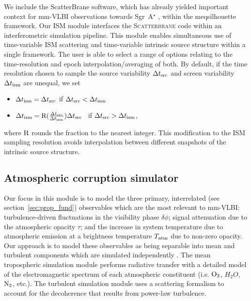 We include the {\sc ScatterBrane} software, which has already yielded important context for mm-VLBI observations towards Sgr~A$^\star$ \citep[e.g.][]{Ortiz_2016}, within the {\sc meqsilhouette} framework. Our ISM module interfaces the \textsc{Scatterbrane} code within an interferometric simulation pipeline. This module enables simultaneous use of time-variable ISM scattering and time-variable intrinsic source structure within a single framework. The user is able to select a range of options relating to the time-resolution and epoch interpolation/averaging of both. By default, if the time resolution chosen to sample the source variability $\Delta t_{\rm src}$ and screen variability $\Delta t_{\rm ism}$ are unequal, we set  
\begin{itemize}
 \setlength\itemsep{1em}
\item $\Delta t_{\rm ism}=\Delta t_{\rm src}$ \qquad \qquad if \qquad  $\Delta t_{\rm src} < \Delta t_{\rm ism}$
\item $\Delta t_{\rm ism}={\rm R}(\frac{\Delta t_{\rm src}}{\Delta t_{\rm ism}})\Delta t_{\rm src}$ \ if \qquad  $\Delta t_{\rm src} > \Delta t_{\rm ism}$,
\end{itemize}
where ${\rm R}$ rounds the fraction to the nearest integer.  This modification to the ISM sampling resolution avoids interpolation between different snapshots of the intrinsic source structure.


\subsection{Atmospheric corruption simulator}\label{sec:trop_imp}

Our focus in this module is to model the three primary, interrelated (see section~\ref{sec:prop_fund}) observables which are the most relevant to mm-VLBI: turbulence-driven fluctuations in the visibility phase $\delta \phi$; signal attenuation due to the atmospheric opacity $\tau$; and the increase in system temperature due to atmospheric emission at a brightness temperature $T_{\rm atm}$ due to non-zero opacity. Our approach is to model these observables as being separable into mean and turbulent components which are simulated independently \citep{Blecher_2016}. The mean tropospheric simulation module performs radiative transfer with a detailed model of the electromagnetic spectrum of each atmospheric constituent (i.e. ${\rm O_2}$, {\rm $H_2O$}, ${\rm N_2}$, etc.). The turbulent simulation module uses a scattering formalism to account for the decoherence that results from power-law turbulence.

